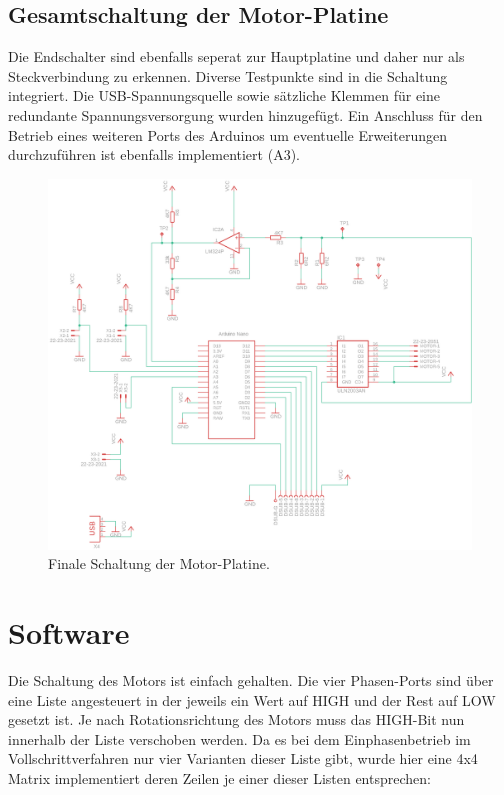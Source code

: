 \documentclass[11pt, titlepage, fleqn]{report}
\begin{document}
			\subsection{Gesamtschaltung der Motor-Platine}
				Die Endschalter sind ebenfalls seperat zur Hauptplatine und daher nur als Steckverbindung zu erkennen. Diverse Testpunkte sind in die Schaltung integriert. Die USB-Spannungsquelle sowie sätzliche Klemmen für eine redundante Spannungsversorgung wurden hinzugefügt. Ein Anschluss für den Betrieb eines weiteren Ports des Arduinos um eventuelle Erweiterungen durchzuführen ist ebenfalls implementiert (A3).
				\vspace{3em}
				\begin{figure}[htbp]
					\centering
					\includegraphics[width=\linewidth]{./img/MotorComplete.png}
					\caption{Finale Schaltung der Motor-Platine.
					\label{fig:MotorComp}}			
				\end{figure}
		\newpage
		\section{Software}
		\label{sec:Software}
			Die Schaltung des Motors ist einfach gehalten. Die vier Phasen-Ports sind über eine Liste angesteuert in der jeweils ein Wert auf HIGH und der Rest auf LOW gesetzt ist. Je nach Rotationsrichtung des Motors muss das HIGH-Bit nun innerhalb der Liste verschoben werden. Da es bei dem Einphasenbetrieb im Vollschrittverfahren nur vier Varianten dieser Liste gibt, wurde hier eine 4x4 Matrix implementiert deren Zeilen je einer dieser Listen entsprechen:
\end{document}
